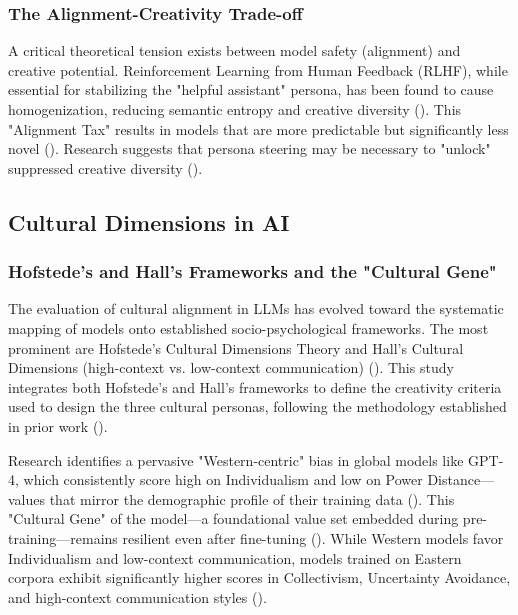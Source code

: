 \documentclass{article}
\begin{document}
\subsubsection{The Alignment-Creativity Trade-off}

A critical theoretical tension exists between model safety (alignment) and creative potential. Reinforcement Learning from Human Feedback (RLHF), while essential for stabilizing the "helpful assistant" persona, has been found to cause homogenization, reducing semantic entropy and creative diversity (\cite{antoine_bellemare_pepin_a5621579, behnam_mohammadi_78154429}). This "Alignment Tax" results in models that are more predictable but significantly less novel (\cite{michael_ryan_c7257c47}). Research suggests that persona steering may be necessary to "unlock" suppressed creative diversity (\cite{mete_ismayilzada_d0dea915}).

\subsection{Cultural Dimensions in AI}

\subsubsection{Hofstede's and Hall's Frameworks and the "Cultural Gene"}

The evaluation of cultural alignment in LLMs has evolved toward the systematic mapping of models onto established socio-psychological frameworks. The most prominent are Hofstede's Cultural Dimensions Theory and Hall's Cultural Dimensions (high-context vs. low-context communication) (\cite{kharchenkoHowWellLLMs2024, reem_i__masoud_f9cde5f1}). This study integrates both Hofstede's and Hall's frameworks to define the creativity criteria used to design the three cultural personas, following the methodology established in prior work (\cite{haririLLMCreativityMeasuringExplaining2025}).

Research identifies a pervasive "Western-centric" bias in global models like GPT-4, which consistently score high on Individualism and low on Power Distance—values that mirror the demographic profile of their training data (\cite{emanuel_z__fenech_borg_a4a3e300, nicholas_sukiennik_6b60add4}). This "Cultural Gene" of the model—a foundational value set embedded during pre-training—remains resilient even after fine-tuning (\cite{emanuel_z__fenech_borg_a4a3e300}). While Western models favor Individualism and low-context communication, models trained on Eastern corpora exhibit significantly higher scores in Collectivism, Uncertainty Avoidance, and high-context communication styles (\cite{minsang_kim_43ca3c83}).
\end{document}
